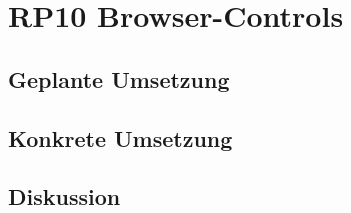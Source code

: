 \section{RP10 Browser-Controls}
\label{sec:principle-rp10-browser-controls}

\subsection*{Geplante Umsetzung}


\subsection*{Konkrete Umsetzung}


\subsection*{Diskussion}
